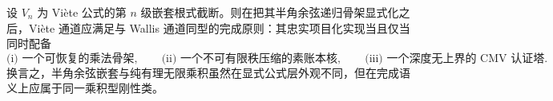 \begin{conjecture}\label{conj:conclusion-viete-halfangle-completion-principle}
设 \(V_n\) 为 Vi\`ete 公式的第 \(n\) 级嵌套根式截断。则在把其半角余弦递归骨架显式化之后，Vi\`ete 通道应满足与 Wallis 通道同型的完成原则：其忠实项目化实现当且仅当同时配备
\[
\text{(i) 一个可恢复的乘法骨架},\qquad
\text{(ii) 一个不可有限秩压缩的素账本核},\qquad
\text{(iii) 一个深度无上界的 CMV 认证塔}.
\]
换言之，半角余弦嵌套与纯有理无限乘积虽然在显式公式层外观不同，但在完成语义上应属于同一乘积型刚性类。
\end{conjecture}
